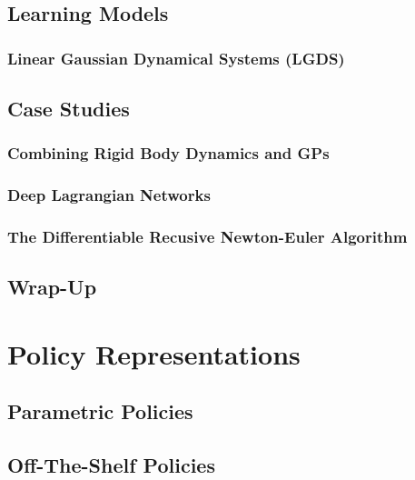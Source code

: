 	\section{Learning Models} %

		\subsection{Linear Gaussian Dynamical Systems (LGDS)} %

	\section{Case Studies} %

		\subsection{Combining Rigid Body Dynamics and GPs} %

		\subsection{Deep Lagrangian Networks} %

		\subsection{The Differentiable Recusive Newton-Euler Algorithm} %

	\section{Wrap-Up} %

\chapter{Policy Representations} %

	\section{Parametric Policies} %

	\section{Off-The-Shelf Policies} %

